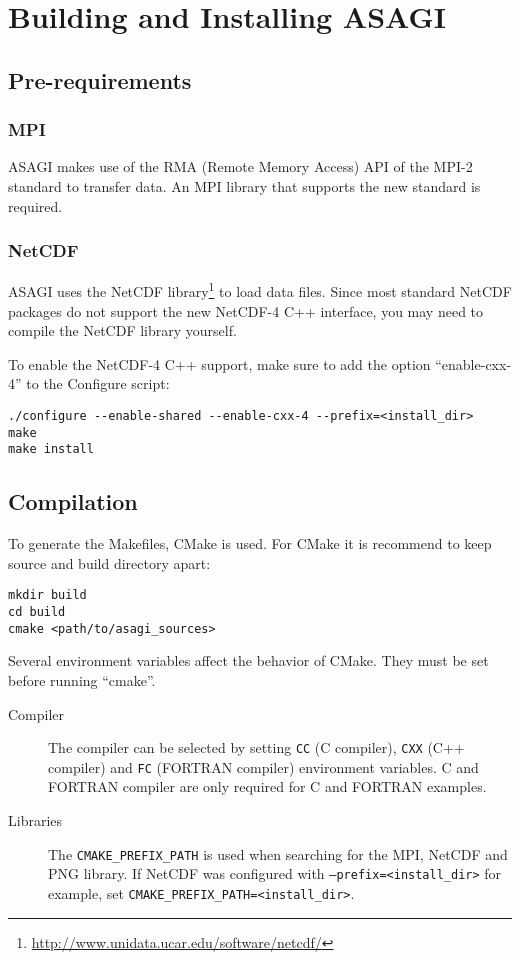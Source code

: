 \section{Building and Installing ASAGI}

\subsection{Pre-requirements}

\subsubsection{MPI}

ASAGI makes use of the RMA (Remote Memory Access) API of the MPI-2 standard to transfer data. An MPI library that supports the new standard is required.

\subsubsection{NetCDF}

ASAGI uses the NetCDF library\footnote{\url{http://www.unidata.ucar.edu/software/netcdf/}} to load data files. Since most standard NetCDF packages do not support the new NetCDF-4 C++ interface, you may need to compile the NetCDF library yourself.

To enable the NetCDF-4 C++ support, make sure to add the option ``enable-cxx-4'' to the Configure script:

\lstset{language=bash}
\begin{lstlisting}
./configure --enable-shared --enable-cxx-4 --prefix=<install_dir>
make
make install
\end{lstlisting}

\subsection{Compilation}
\label{sec:compilation}

To generate the Makefiles, CMake is used. For CMake it is recommend to keep source and build directory apart:

\lstset{language=bash}
\begin{lstlisting}
mkdir build
cd build
cmake <path/to/asagi_sources>
\end{lstlisting}

Several environment variables affect the behavior of CMake. They must be set before running ``cmake''.

\begin{description}
 \item[Compiler] The compiler can be selected by setting \texttt{CC} (C compiler), \texttt{CXX} (C++ compiler) and \texttt{FC} (FORTRAN compiler) environment variables. C and FORTRAN compiler are only required for C and FORTRAN examples.
 \item[Libraries] The \texttt{CMAKE\_PREFIX\_PATH} is used when searching for the MPI, Net\-CDF and PNG library. If NetCDF was configured with \texttt{--prefix=<in\-stall\_dir>} for example, set \texttt{CMAKE\_PREFIX\_PATH=<install\_dir>}.
\end{description}

